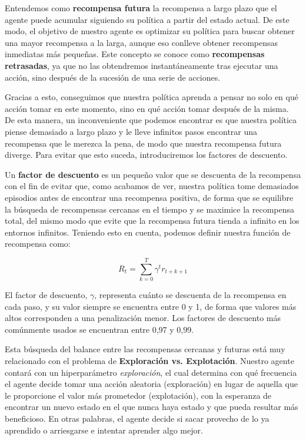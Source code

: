Entendemos como \textbf{recompensa futura} la recompensa a largo plazo que el agente puede acumular siguiendo su política a partir del estado actual. De este modo, el objetivo de nuestro agente es optimizar su política para buscar obtener una mayor recompensa a la larga, aunque eso conlleve obtener recompensas inmediatas más pequeñas. Este concepto se conoce como \textbf{recompensas retrasadas}, ya que no las obtendremos instantáneamente tras ejecutar una acción, sino después de la sucesión de una serie de acciones.

Gracias a esto, conseguimos que nuestra política aprenda a pensar no solo en qué acción tomar en este momento, sino en qué acción tomar después de la misma. De esta manera, un inconveniente que podemos encontrar es que nuestra política piense demasiado a largo plazo y le lleve infinitos pasos encontrar una recompensa que le merezca la pena, de modo que nuestra recompensa futura diverge. Para evitar que esto suceda, introduciremos los factores de descuento.

Un \textbf{factor de descuento} es un pequeño valor que se descuenta de la recompensa con el fin de evitar que, como acabamos de ver, nuestra política tome demasiados episodios antes de encontrar una recompensa positiva, de forma que se equilibre la búsqueda de recompensas cercanas en el tiempo y se maximice la recompensa total, del mismo modo que evite que la recompensa futura tienda a infinito en los entornos infinitos. Teniendo esto en cuenta, podemos definir nuestra función de recompensa como:

$$R_{t} = \sum^{T}_{k = 0} \gamma^{t}r_{t + k + 1}$$

El factor de descuento, \( \gamma \), representa cuánto se descuenta de la recompensa en cada paso, y su valor siempre se encuentra entre 0 y 1, de forma que valores más altos corresponden a una penalización menor. Los factores de descuento más comúnmente usados se encuentran entre 0,97 y 0,99.

Esta búsqueda del balance entre las recompensas cercanas y futuras está muy relacionado con el problema de \textbf{Exploración vs. Explotación}. Nuestro agente contará con un hiperparámetro \textit{exploración}, el cual determina con qué frecuencia el agente decide tomar una acción aleatoria (exploración) en lugar de aquella que le proporcione el valor más prometedor (explotación), con la esperanza de encontrar un nuevo estado en el que nunca haya estado y que pueda resultar más beneficioso. En otras palabras, el agente decide si sacar provecho de lo ya aprendido o arriesgarse e intentar aprender algo mejor.

